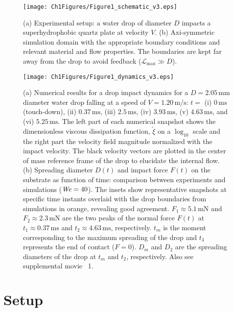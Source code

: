 \begin{figure}
	\centering
	\texttt{[image: Ch1Figures/Figure1\_schematic\_v3.eps]}
	\caption{(a) Experimental setup: a water drop of diameter $D$ impacts a superhydrophobic quartz plate at velocity $V$. (b) Axi-symmetric simulation domain with the appropriate boundary conditions and relevant material and flow properties. The boundaries are kept far away from the drop to avoid feedback ($\mathcal{L}_\text{max} \gg D$).}
	\label{Ch2:Fig1Schematic}
\end{figure}

\begin{sidewaysfigure}
	\centering
	\texttt{[image: Ch1Figures/Figure1\_dynamics\_v3.eps]}
	\caption{(a) Numerical results for a drop impact dynamics for a $D = 2.05\,\si{\milli\meter}$ diameter water drop falling at a speed of $V = 1.20\,\si{\meter}/\si{\second}$: $t =$ (i) $0\,\si{\milli\second}$ (touch-down), (ii) $0.37\,\si{\milli\second}$, (iii) $2.5\,\si{\milli\second}$, (iv) $3.93\,\si{\milli\second}$, (v) $4.63\,\si{\milli\second}$, and (vi) $5.25\,\si{\milli\second}$. The left part of each numerical snapshot shows the dimensionless viscous dissipation function, $\tilde{\xi}$ on a $\log_{10}$ scale and the right part the velocity field magnitude normalized with the impact velocity. The black velocity vectors are plotted in the center of mass reference frame of the drop to elucidate the internal flow. (b)  Spreading diameter $D(t)$ and impact force $F(t)$ on the substrate as function of time: comparison between experiments  and simulations ($\mathit{We} = 40$). The insets show representative snapshots at specific time instants overlaid with the drop boundaries from simulations in orange, revealing good agreement. $F_1 \approx 5.1\,\si{\milli\newton}$ and  $F_2 \approx 2.3\,\si{\milli\newton}$ are the two peaks of the normal  force $F(t)$ at $t_1 \approx 0.37\,\si{\milli\second}$ and $t_2 \approx 4.63\,\si{\milli\second}$, respectively. $t_m$ is the moment corresponding to the maximum spreading of the drop and $t_3$ represents the end of contact ($F = 0$). $D_m$ and $D_2$ are the spreading diameters of the drop at $t_m$ and $t_2$, respectively. Also see supplemental movie~{\color{Myfig} 1}.}
	\label{Ch2:Fig1Dynamics}
\end{sidewaysfigure}

\section{Setup}\label{Ch2:SecSetup}


